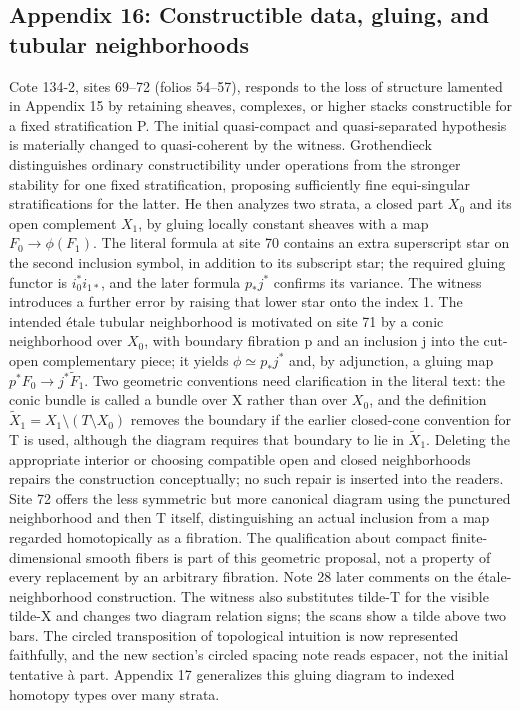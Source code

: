 \documentclass[10pt,oneside]{book}
\begin{document}
\subsection*{Appendix 16: Constructible data, gluing, and tubular neighborhoods}
Cote 134-2, sites 69--72 (folios 54--57), responds to the loss of structure lamented in Appendix 15 by retaining sheaves, complexes, or higher stacks constructible for a fixed stratification P. The initial quasi-compact and quasi-separated hypothesis is materially changed to quasi-coherent by the witness. Grothendieck distinguishes ordinary constructibility under operations from the stronger stability for one fixed stratification, proposing sufficiently fine equi-singular stratifications for the latter. He then analyzes two strata, a closed part $X_0$ and its open complement $X_1$, by gluing locally constant sheaves with a map $F_0\to\phi(F_1)$. The literal formula at site 70 contains an extra superscript star on the second inclusion symbol, in addition to its subscript star; the required gluing functor is $i_0^*i_{1*}$, and the later formula $p_*j^*$ confirms its variance. The witness introduces a further error by raising that lower star onto the index 1. The intended étale tubular neighborhood is motivated on site 71 by a conic neighborhood over $X_0$, with boundary fibration p and an inclusion j into the cut-open complementary piece; it yields $\phi\simeq p_*j^*$ and, by adjunction, a gluing map $p^*F_0\to j^*\widetilde F_1$. Two geometric conventions need clarification in the literal text: the conic bundle is called a bundle over X rather than over $X_0$, and the definition $\widetilde X_1=X_1\setminus(T\setminus X_0)$ removes the boundary if the earlier closed-cone convention for T is used, although the diagram requires that boundary to lie in $\widetilde X_1$. Deleting the appropriate interior or choosing compatible open and closed neighborhoods repairs the construction conceptually; no such repair is inserted into the readers. Site 72 offers the less symmetric but more canonical diagram using the punctured neighborhood and then T itself, distinguishing an actual inclusion from a map regarded homotopically as a fibration. The qualification about compact finite-dimensional smooth fibers is part of this geometric proposal, not a property of every replacement by an arbitrary fibration. Note 28 later comments on the étale-neighborhood construction. The witness also substitutes tilde-T for the visible tilde-X and changes two diagram relation signs; the scans show a tilde above two bars. The circled transposition of topological intuition is now represented faithfully, and the new section's circled spacing note reads espacer, not the initial tentative à part. Appendix 17 generalizes this gluing diagram to indexed homotopy types over many strata.
\end{document}
